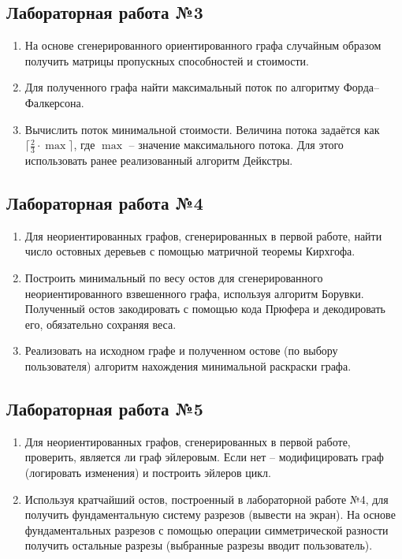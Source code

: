 \subsection*{Лабораторная работа №3}
\begin{enumerate}
	\item На основе сгенерированного ориентированного графа случайным образом получить матрицы пропускных способностей и стоимости.
	\item Для полученного графа найти максимальный поток по алгоритму Форда–Фалкерсона.
	\item Вычислить поток минимальной стоимости. Величина потока задаётся как $\lceil \frac{2}{3} \cdot \max \rceil$, где $\max$ – значение максимального потока. Для этого использовать ранее реализованный алгоритм Дейкстры.
\end{enumerate}

\subsection*{Лабораторная работа №4}
\begin{enumerate}
	\item Для неориентированных графов, сгенерированных в первой работе, найти число остовных деревьев с помощью матричной теоремы Кирхгофа.
	\item Построить минимальный по весу остов для сгенерированного неориентированного взвешенного графа, используя алгоритм Борувки. Полученный остов закодировать с помощью кода Прюфера и декодировать его, обязательно сохраняя веса.
	\item Реализовать на исходном графе и полученном остове (по выбору пользователя) алгоритм нахождения минимальной раскраски графа.
\end{enumerate}

\subsection*{Лабораторная работа №5}
\begin{enumerate}
	\item Для неориентированных графов, сгенерированных в первой работе, проверить, является ли граф эйлеровым. Если нет – модифицировать граф (логировать изменения) и построить эйлеров цикл.
	\item Используя кратчайший остов, построенный в лабораторной работе №4, для получить фундаментальную систему разрезов (вывести на экран). На основе фундаментальных разрезов с помощью операции симметрической разности получить остальные разрезы (выбранные разрезы вводит пользователь).
\end{enumerate}